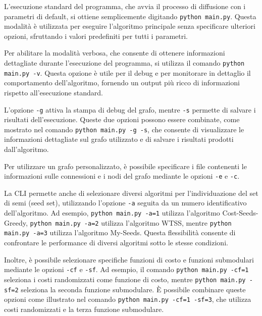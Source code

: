 L'esecuzione standard del programma, che avvia il processo di diffusione con i parametri di default, si ottiene semplicemente digitando \texttt{python main.py}. Questa modalità è utilizzata per eseguire l'algoritmo principale senza specificare ulteriori opzioni, sfruttando i valori predefiniti per tutti i parametri.

Per abilitare la modalità verbosa, che consente di ottenere informazioni dettagliate durante l'esecuzione del programma, si utilizza il comando \texttt{python main.py -v}. Questa opzione è utile per il debug e per monitorare in dettaglio il comportamento dell'algoritmo, fornendo un output più ricco di informazioni rispetto all'esecuzione standard.

L'opzione \texttt{-g} attiva la stampa di debug del grafo, mentre \texttt{-s} permette di salvare i risultati dell'esecuzione. Queste due opzioni possono essere combinate, come mostrato nel comando \texttt{python main.py -g -s}, che consente di visualizzare le informazioni dettagliate sul grafo utilizzato e di salvare i risultati prodotti dall'algoritmo.

Per utilizzare un grafo personalizzato, è possibile specificare i file contenenti le informazioni sulle connessioni e i nodi del grafo mediante le opzioni \texttt{-e} e \texttt{-c}.

La CLI permette anche di selezionare diversi algoritmi per l'individuazione del set di semi (seed set), utilizzando l'opzione \texttt{-a} seguita da un numero identificativo dell'algoritmo. Ad esempio, \texttt{python main.py -a=1} utilizza l'algoritmo Cost-Seeds-Greedy, \texttt{python main.py -a=2} utilizza l'algoritmo WTSS, mentre \texttt{python main.py -a=3} utilizza l'algoritmo My-Seeds. Questa flessibilità consente di confrontare le performance di diversi algoritmi sotto le stesse condizioni.

Inoltre, è possibile selezionare specifiche funzioni di costo e funzioni submodulari mediante le opzioni \texttt{-cf} e \texttt{-sf}. Ad esempio, il comando \texttt{python main.py -cf=1} seleziona i costi randomizzati come funzione di costo, mentre \texttt{python main.py -sf=2} seleziona la seconda funzione submodulare. È possibile combinare queste opzioni come illustrato nel comando \texttt{python main.py -cf=1 -sf=3}, che utilizza costi randomizzati e la terza funzione submodulare.

